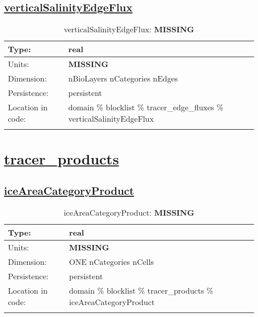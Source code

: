 \subsection[verticalSalinityEdgeFlux]{\hyperref[sec:var_tab_tracer_edge_fluxes]{verticalSalinityEdgeFlux}}
\label{subsec:var_sec_tracer_edge_fluxes_verticalSalinityEdgeFlux}
\begin{center}
\begin{longtable}{| p{2.0in} | p{4.0in} |}
        \hline 
        Type: & real \\
        \hline 
        Units: & {\bf \color{red} MISSING} \\
        \hline 
        Dimension: & nBioLayers nCategories nEdges \\
        \hline 
        Persistence: & persistent \\
        \hline 
         Location in code: & domain \% blocklist \% tracer\_edge\_fluxes \% verticalSalinityEdgeFlux \\
         \hline 
    \caption{verticalSalinityEdgeFlux: {\bf \color{red} MISSING}}
\end{longtable}
\end{center}
\section[tracer\_products]{\hyperref[sec:var_tab_tracer_products]{tracer\_products}}
\label{sec:var_sec_tracer_products}
\subsection[iceAreaCategoryProduct]{\hyperref[sec:var_tab_tracer_products]{iceAreaCategoryProduct}}
\label{subsec:var_sec_tracer_products_iceAreaCategoryProduct}
\begin{center}
\begin{longtable}{| p{2.0in} | p{4.0in} |}
        \hline 
        Type: & real \\
        \hline 
        Units: & {\bf \color{red} MISSING} \\
        \hline 
        Dimension: & ONE nCategories nCells \\
        \hline 
        Persistence: & persistent \\
        \hline 
         Location in code: & domain \% blocklist \% tracer\_products \% iceAreaCategoryProduct \\
         \hline 
    \caption{iceAreaCategoryProduct: {\bf \color{red} MISSING}}
\end{longtable}
\end{center}
